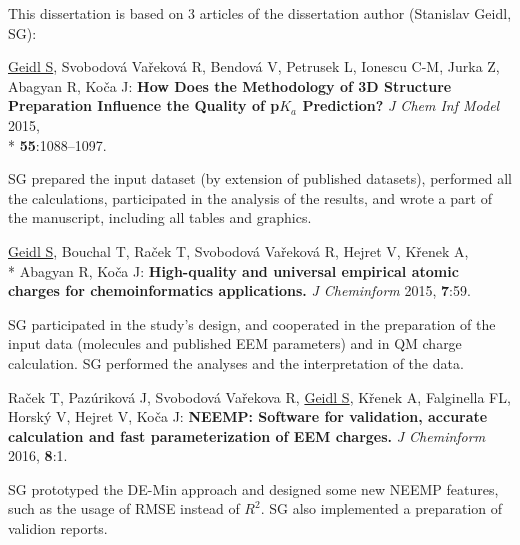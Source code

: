 \documentclass[11pt,b5paper,oneside,final]{book}
\begin{document}
This dissertation is based on 3 articles of the dissertation author (Stanislav Geidl, SG): 

\vspace{10mm}

\underline{Geidl S}, Svobodová Vařeková R, Bendová V, Petrusek L, Ionescu C-M,
Jurka Z, Abagyan R, Koča J: \textbf{How Does the Methodology of 3D Structure
Preparation Influence the Quality of p$K_a$ Prediction?} \textit{J Chem Inf Model}
2015, \\* \textbf{55}:1088–1097.

\vspace{5mm}

SG prepared the input dataset (by extension of published datasets), performed
all the calculations, participated in the analysis of the results, and wrote
a part of the manuscript, including all tables and graphics.

\vspace{10mm}

\underline{Geidl S}, Bouchal T, Raček T, Svobodová Vařeková R, Hejret V,
Křenek A,\\* Abagyan R, Koča J: \textbf{High-quality and universal empirical atomic
charges for chemoinformatics applications.} \textit{J Cheminform} 2015,
\textbf{7}:59.

\vspace{5mm}

SG participated in the study's design, and cooperated in the preparation of
the input data (molecules and published EEM parameters) and in QM charge 
calculation. SG performed the analyses and the interpretation of the data.

\vspace{10mm}

Raček T, Pazúriková J, Svobodová Vařekova R, \underline{Geidl S}, Křenek A,
Falginella FL, Horský V, Hejret V, Koča J: \textbf{NEEMP: Software
for validation, accurate calculation and fast parameterization of EEM charges.}
\textit{J Cheminform} 2016, \textbf{8}:1.

\vspace{5mm}

SG prototyped the DE-Min approach and designed some new NEEMP features, such as
the usage of RMSE instead of $R^2$. SG also implemented a preparation of validion
reports.

\clearpage

\tableofcontents

\clearpage
{}
\end{document}
